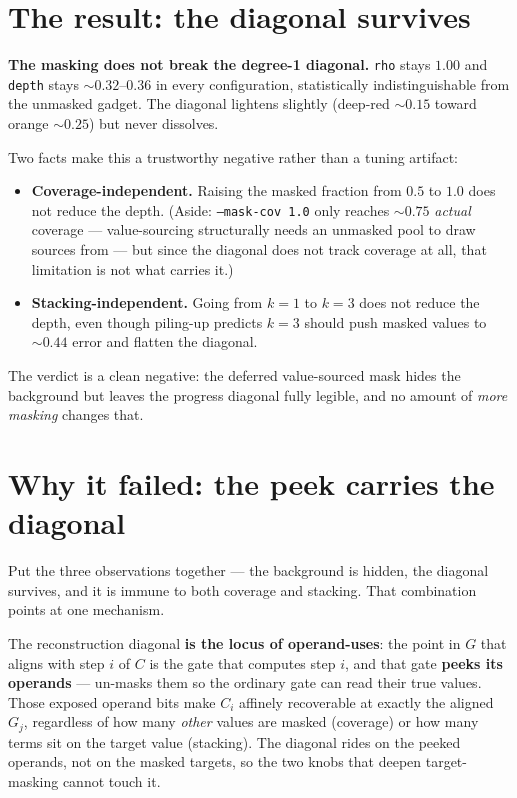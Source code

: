 \documentclass[11pt]{article}
\newcommand{\code}[1]{\texttt{#1}}
\begin{document}
\section{The result: the diagonal survives}

\textbf{The masking does not break the degree-1 diagonal.} \code{rho} stays
$1.00$ and \code{depth} stays ${\sim}0.32$--$0.36$ in every configuration,
statistically indistinguishable from the unmasked gadget. The diagonal
lightens slightly (deep-red ${\sim}0.15$ toward orange ${\sim}0.25$) but
never dissolves.

Two facts make this a trustworthy negative rather than a tuning artifact:

\begin{itemize}
\item \textbf{Coverage-independent.} Raising the masked fraction from $0.5$ to
$1.0$ does not reduce the depth. (Aside: \code{--mask-cov 1.0} only reaches
${\sim}0.75$ \emph{actual} coverage --- value-sourcing structurally needs an
unmasked pool to draw sources from --- but since the diagonal does not track
coverage at all, that limitation is not what carries it.)
\item \textbf{Stacking-independent.} Going from $k{=}1$ to $k{=}3$ does not
reduce the depth, even though piling-up predicts $k{=}3$ should push masked
values to ${\sim}0.44$ error and flatten the diagonal.
\end{itemize}

The verdict is a clean negative: the deferred value-sourced mask hides the
background but leaves the progress diagonal fully legible, and no amount of
\emph{more masking} changes that.

\section{Why it failed: the peek carries the diagonal}

Put the three observations together --- the background is hidden, the diagonal
survives, and it is immune to both coverage and stacking. That combination
points at one mechanism.

The reconstruction diagonal \textbf{is the locus of operand-uses}: the point
in $G$ that aligns with step $i$ of $C$ is the gate that computes step $i$,
and that gate \textbf{peeks its operands} --- un-masks them so the ordinary
gate can read their true values. Those exposed operand bits make $C_i$
affinely recoverable at exactly the aligned $G_j$, regardless of how many
\emph{other} values are masked (coverage) or how many terms sit on the target
value (stacking). The diagonal rides on the peeked operands, not on the
masked targets, so the two knobs that deepen target-masking cannot touch it.
\end{document}
